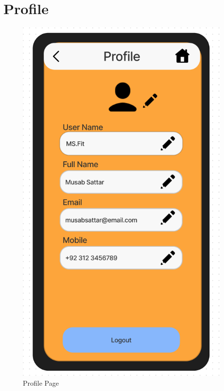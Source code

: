 \documentclass[title page]{article}
\begin{document}
\section{Profile}
\begin{figure}[!h]
    \begin{center}
          \includegraphics[height=19cm]{profile.png}
          \caption{Profile Page}
          \label{fig:profile}
    \end{center}
\end{figure}
\end{document}
